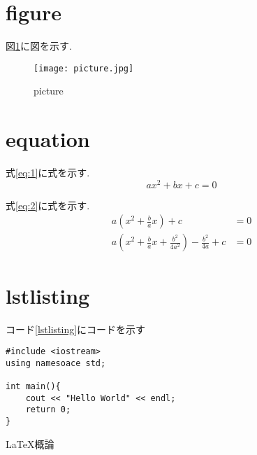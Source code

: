 \documentclass[11pt, a4paper]{jsarticle}
\begin{document}
\section{figure}
図\ref{picture}に図を示す. %
\begin{figure}[H]
\centering
\texttt{[image: picture.jpg]}
\caption{picture}
\label{picture}
\end{figure}

\section{equation} %
式\ref{eq:1}に式を示す.
\begin{equation}
\label{eq:1}
ax^2 + bx + c = 0
\end{equation}

式\ref{eq:2}に式を示す.
\begin{align}
\label{eq:2}
a \left(x^2 + \frac{b}{a}x \right) + c &= 0\\
a \left(x^2 + \frac{b}{a}x + \frac{b^2}{4a^2} \right) - \frac{b^2}{4a} + c &= 0
\end{align}

\section{lstlisting}
コード\ref{lstlisting}にコードを示す
\begin{lstlisting}[caption=code.cpp,label=lstlisting]
#include <iostream>
using namesoace std;

int main(){
    cout << "Hello World" << endl;
    return 0;
}
\end{lstlisting}

 
\begin{thebibliography}{99}
     \LaTeX 概論
\end{thebibliography}
\end{document}
